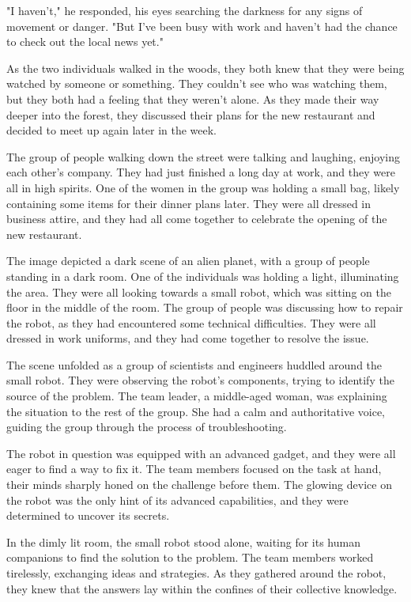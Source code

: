\documentclass[smalldemyvopaper,11pt,twoside,onecolumn,openright,extrafontsizes]{memoir}
\begin{document}
"I haven't," he responded, his eyes searching the darkness for any signs of movement or danger. "But I've been busy with work and haven't had the chance to check out the local news yet."\par
As the two individuals walked in the woods, they both knew that they were being watched by someone or something. They couldn't see who was watching them, but they both had a feeling that they weren't alone. As they made their way deeper into the forest, they discussed their plans for the new restaurant and decided to meet up again later in the week.\par
The group of people walking down the street were talking and laughing, enjoying each other's company. They had just finished a long day at work, and they were all in high spirits. One of the women in the group was holding a small bag, likely containing some items for their dinner plans later. They were all dressed in business attire, and they had all come together to celebrate the opening of the new restaurant.\par
The image depicted a dark scene of an alien planet, with a group of people standing in a dark room. One of the individuals was holding a light, illuminating the area. They were all looking towards a small robot, which was sitting on the floor in the middle of the room. The group of people was discussing how to repair the robot, as they had encountered some technical difficulties. They were all dressed in work uniforms, and they had come together to resolve the issue.\par
The scene unfolded as a group of scientists and engineers huddled around the small robot. They were observing the robot's components, trying to identify the source of the problem. The team leader, a middle-aged woman, was explaining the situation to the rest of the group. She had a calm and authoritative voice, guiding the group through the process of troubleshooting.\par
The robot in question was equipped with an advanced gadget, and they were all eager to find a way to fix it. The team members focused on the task at hand, their minds sharply honed on the challenge before them. The glowing device on the robot was the only hint of its advanced capabilities, and they were determined to uncover its secrets.\par
In the dimly lit room, the small robot stood alone, waiting for its human companions to find the solution to the problem. The team members worked tirelessly, exchanging ideas and strategies. As they gathered around the robot, they knew that the answers lay within the confines of their collective knowledge.\par
\end{document}
